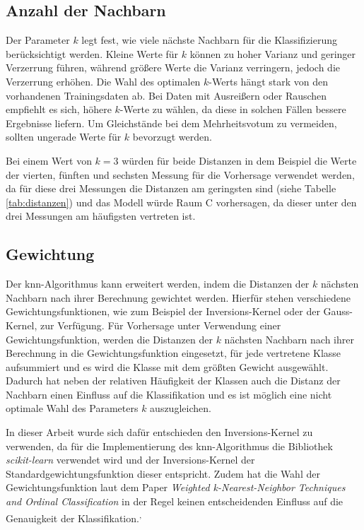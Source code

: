 \subsection{Anzahl der Nachbarn}

Der Parameter \( k \) legt fest, wie viele nächste Nachbarn für die Klassifizierung berücksichtigt werden. Kleine Werte für \( k \) können zu hoher Varianz und geringer Verzerrung führen, während größere Werte die Varianz verringern, jedoch die Verzerrung erhöhen. Die Wahl des optimalen \( k \)-Werts hängt stark von den vorhandenen Trainingsdaten ab. Bei Daten mit Ausreißern oder Rauschen empfiehlt es sich, höhere \( k \)-Werte zu wählen, da diese in solchen Fällen bessere Ergebnisse liefern. Um Gleichstände bei dem Mehrheitsvotum zu vermeiden, sollten ungerade Werte für \( k \) bevorzugt werden.

Bei einem Wert von \( k = 3 \) würden für beide Distanzen in dem Beispiel die Werte der vierten, fünften und sechsten Messung für die Vorhersage verwendet werden, da für diese drei Messungen die Distanzen am geringsten sind (siehe Tabelle \ref{tab:distanzen}) und das Modell würde Raum C vorhersagen, da dieser unter den drei Messungen am häufigsten vertreten ist.

\subsection{Gewichtung}

Der \gls{knn}-Algorithmus kann erweitert werden, indem die Distanzen der \( k \) nächsten Nachbarn nach ihrer Berechnung gewichtet werden. Hierfür stehen verschiedene Gewichtungsfunktionen, wie zum Beispiel der Inversions-Kernel oder der Gauss-Kernel, zur Verfügung. Für Vorhersage unter Verwendung einer Gewichtungsfunktion, werden die Distanzen der \( k \) nächsten Nachbarn nach ihrer Berechnung in die Gewichtungsfunktion eingesetzt, für jede vertretene Klasse aufsummiert und es wird die Klasse mit dem größten Gewicht ausgewählt. Dadurch hat neben der relativen Häufigkeit der Klassen auch die Distanz der Nachbarn einen Einfluss auf die Klassifikation und es ist möglich eine nicht optimale Wahl des Parameters \( k \) auszugleichen.

In dieser Arbeit wurde sich dafür entschieden den Inversions-Kernel zu verwenden, da für die Implementierung des \gls{knn}-Algorithmus die Bibliothek \textit{scikit-learn} verwendet wird und der Inversions-Kernel der Standardgewichtungsfunktion dieser entspricht. Zudem hat die Wahl der Gewichtungsfunktion laut dem Paper \textit{Weighted k-Nearest-Neighbor Techniques and Ordinal Classification} in der Regel keinen entscheidenden Einfluss auf die Genauigkeit der Klassifikation.\textsuperscript{,}


